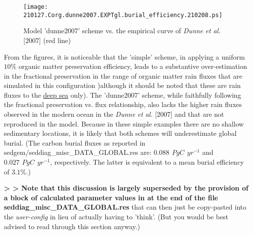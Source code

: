 \vspace{-2mm}

\begin{figure}[H]
\texttt{[image: 210127.Corg.dunne2007.EXPTgl.burial\_efficiency.210208.ps]}
\caption{Model  'dunne2007' scheme vs. the empirical curve of \textit{Dunne et al.} [2007] (red line)}
\label{fig:carbon_burial_dunne2007}
\end{figure}

From the figures, it is noticeable that the 'simple' scheme, in applying a uniform \(10 \%\) organic matter preservation efficiency, leads to a substantive over-estimation in the fractional preservation in the range of organic matter rain fluxes that are simulated in this configuration )although it should be noted that these are rain fluxes to the \uline{deep sea} only). The 'dunne2007' scheme, while faithfully following the fractional preservation vs. flux relationship, also lacks the higher rain fluxes observed in the modern ocean in the \textit{Dunne et al.} [2007] and that are not reproduced in the model. Because in these simple examples there are no shallow sedimentary locations, it is likely that both schemes will underestimate global burial. (The  carbon burial fluxes as reported in \textsf{\footnotesize sedgem/seddiag\_misc\_DATA\_GLOBAL.res} are: \(0.088\,\ PgC\,\ yr^{-1}\) and \(0.027\,\ PgC\,\ yr^{-1}\), respectively. The latter is equivalent to a mean burial efficiency of \(3.1\%\).)


\noindent \textbf{> > Note that this discussion is largely superseded by the provision of a block of calculated parameter values  in at the end of the file \textsf{\footnotesize seddiag\_misc\_DATA\_GLOBAL.res}} that can then just be copy-pasted into the \textit{user-config} in lieu of actually having to 'think'. (But you would be best advised to read through this section anyway.)
\vspace{2mm}

